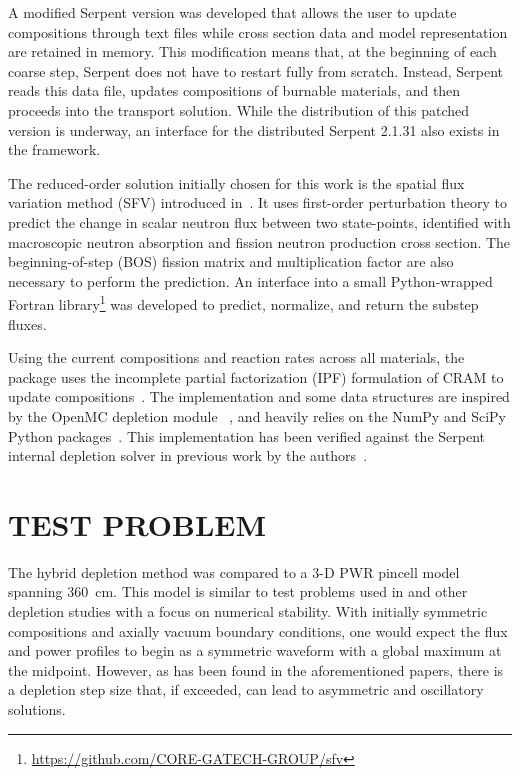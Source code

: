 \documentclass[letterpaper]{mc2021}
\begin{document}
A modified Serpent version was developed that allows the user to update compositions
through text files while cross section data and model representation are retained in memory.
This modification means that, at the beginning of each coarse step, Serpent does not
have to restart fully from scratch.
Instead, Serpent reads this data file, updates compositions of burnable materials,
and then proceeds into the transport solution.
While the distribution of this patched version is underway, an interface for the distributed
Serpent 2.1.31 also exists in the framework.

The reduced-order solution initially chosen for this work is the spatial flux variation
method (SFV) introduced in~\cite{Johnson2020TransportFreeMethod}.
It uses first-order perturbation theory to predict the change in scalar neutron
flux between two state-points, identified with macroscopic neutron absorption and
fission neutron production cross section.
The beginning-of-step (BOS) fission matrix and multiplication factor are also
necessary to perform the prediction.
An interface into a small Python-wrapped Fortran library\footnote{\url{https://github.com/CORE-GATECH-GROUP/sfv}}
was developed to predict, normalize, and return the substep fluxes.

Using the current compositions and reaction rates across all materials,
the package uses the incomplete partial factorization (IPF) formulation
of CRAM to update compositions~\cite{Pusa2016HigherOrderChebyshev,Pusa2010ComputingMatrixExponential}.
The implementation and some data structures are inspired by the OpenMC depletion module%
~\cite{Romano2020DepletionCapabilitiesOpenmc}, and heavily relies on the NumPy
and SciPy Python packages~\cite{Walt2007NumpyArrayStructure,Jones2001ScipyOpenSource}.
This implementation has been verified against the Serpent internal depletion solver
in previous work by the authors~\cite{Johnson2020TransportFreeMethod}.

\section{TEST PROBLEM}

The hybrid depletion method was compared to a 3-D PWR pincell model spanning 360\ cm.
This model is similar to test problems used in
\cite{Densmore2013StabilityAnalysisBurnup,Johnson2020TransportFreeMethod}
and other depletion studies with a focus on numerical stability.
With initially symmetric compositions and axially vacuum boundary conditions, one
would expect the flux and power profiles to begin as a symmetric waveform
with a global maximum at the midpoint.
However, as has been found in the aforementioned papers, there is a depletion step size
that, if exceeded, can lead to asymmetric and oscillatory solutions.
\end{document}
